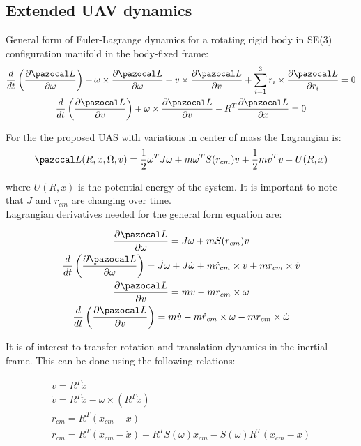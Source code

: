 \subsection{Extended UAV dynamics}

General form of Euler-Lagrange dynamics for a rotating rigid body in SE(3) configuration manifold in the body-fixed frame:
\begin{gather}
	\frac{d}{dt} \left( \frac{\partial \La}{\partial \omega} \right)
	+ \omega \times \frac{\partial \La}{\partial \omega} 
	+ v \times \frac{\partial \La}{\partial v} 
	+ \sum_{i=1}^{3} r_i \times \frac{\partial \La}{\partial r_i} = 0 \label{general1}\\
	\frac{d}{dt} \left( \frac{\partial \La}{\partial v} \right)
	+ \omega \times \frac{\partial \La}{\partial v} 
	- R^T \frac{\partial \La}{\partial x} = 0 \label{general2}
\end{gather}

For the the proposed UAS with variations in center of mass the Lagrangian is:
\begin{equation}
	\La(R,x,\Omega,v) = \frac{1}{2}\omega^TJ\omega + m \omega^T S(r_{cm})v + \frac{1}{2}mv^Tv - U(R,x)
\end{equation}

\noindent where $U(R,x)$ is the potential energy of the system. It is important to note that $J$ and $r_{cm}$ are changing over time. \\
Lagrangian derivatives needed for the general form equation are:

\begin{gather}
	\frac{\partial \La}{\partial \omega} = J\omega + m S(r_{cm})v \label{d1}\\ 
	\frac{d}{dt} \left( \frac{\partial \La}{\partial \omega} \right) = \dot{J} \omega + J \dot{\omega} + m \dot{r}_{cm} \times v + m r_{cm} \times \dot{v} \label{d2}\\ 
	\frac{\partial \La}{\partial v} = mv - mr_{cm} \times \omega \label{d3}\\ 
	\frac{d}{dt} \left( \frac{\partial \La}{\partial v} \right) = m\dot{v} - m\dot{r}_{cm} \times \omega - m r_{cm} \times \dot{\omega} \label{d4}
\end{gather}

It is of interest to transfer rotation and translation dynamics in the inertial frame. This can be done using the following relations:

\begin{gather}
	v = R^T \dot{x} \label{inertial1}\\
	\dot{v} = R^T \ddot{x} - \omega \times (R^T \dot{x} ) \label{inertial2} \\
	r_{cm} = R^T(x_{cm} - x) \label{inertial3} \\
	\dot{r}_{cm} = R^T(\dot{x}_{cm} - \dot{x}) + R^TS(\omega)x_{cm} - S(\omega)R^T(x_{cm} - x) \label{inertial4}
\end{gather}

